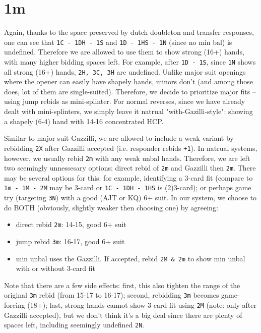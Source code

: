 \section{1m}

Again, thanks to the space preserved by dutch doubleton and transfer responses, one can see that \texttt{1C - 1DH - 1S} and \texttt{1D - 1HS - 1N} (since no min bal) is undefined.
Therefore we are allowed to use them to show strong (16+) hands, with many higher bidding spaces left.
For example, after \texttt{1D - 1S}, since \texttt{1N} shows all strong (16+) hands, \texttt{2H, 3C, 3H} are undefined.
Unlike major suit openings where the opener can easily have shapely hands, minors don't (and among those does, lot of them are single-suited).
Therefore, we decide to prioritize major fits -- using jump rebids as mini-splinter.
For normal reverses, since we have already dealt with mini-splinters, we simply leave it natrual "with-Gazilli-style": showing a shapely (6-4) hand with 14-16 concentrated HCP.


Similar to major suit Gazzilli, we are allowed to include a weak variant by rebidding \texttt{2X} after Gazzilli accepted (i.e. responder rebids \texttt{+1}).
In natrual systems, however, we usually rebid \texttt{2m} with any weak unbal hands. Therefore, we are left two seemingly unnessesary options: direct rebid of \texttt{2m} and Gazzilli then \texttt{2m}.
There may be several options for this: for example, identifying a 3-card fit (compare to \texttt{1m - 1M - 2M} may be 3-card or \texttt{1C - 1DH - 1HS} is (2)3-card); or perhaps game try (targeting \texttt{3N}) with a good (AJT or KQ) 6+ suit.
In our system, we choose to do BOTH (obviously, slightly weaker then choosing one) by agreeing:
\begin{itemize}
  \setlength\itemsep{0pt}
  \item direct rebid \texttt{2m}: 14-15, good 6+ suit
  \item jump rebid \texttt{3m}: 16-17, good 6+ suit
  \item min unbal uses the Gazzilli. If accepted, rebid \texttt{2M \& 2m} to show min unbal with or without 3-card fit
\end{itemize}
Note that there are a few side effects: first, this also tighten the range of the original \texttt{3m} rebid (from 15-17 to 16-17);
second, rebidding \texttt{3m} becomes game-forcing (18+);
last, strong hands cannot show 3-card fit using \texttt{2M} (note: only after Gazzilli accepted), but we don't think it's a big deal since there are plenty of spaces left, including seemingly undefined \texttt{2N}.

